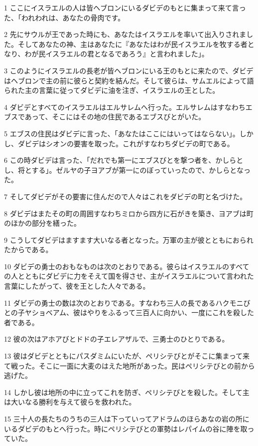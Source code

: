 \par 1 ここにイスラエルの人は皆ヘブロンにいるダビデのもとに集まって来て言った、「われわれは、あなたの骨肉です。
\par 2 先にサウルが王であった時にも、あなたはイスラエルを率いて出入りされました。そしてあなたの神、主はあなたに『あなたはわが民イスラエルを牧する者となり、わが民イスラエルの君となるであろう』と言われました」。
\par 3 このようにイスラエルの長老が皆ヘブロンにいる王のもとに来たので、ダビデはヘブロンで主の前に彼らと契約を結んだ。そして彼らは、サムエルによって語られた主の言葉に従ってダビデに油を注ぎ、イスラエルの王とした。
\par 4 ダビデとすべてのイスラエルはエルサレムへ行った。エルサレムはすなわちエブスであって、そこにはその地の住民であるエブスびとがいた。
\par 5 エブスの住民はダビデに言った、「あなたはここにはいってはならない」。しかし、ダビデはシオンの要害を取った。これがすなわちダビデの町である。
\par 6 この時ダビデは言った、「だれでも第一にエブスびとを撃つ者を、かしらとし、将とする」。ゼルヤの子ヨアブが第一にのぼっていったので、かしらとなった。
\par 7 そしてダビデがその要害に住んだので人々はこれをダビデの町と名づけた。
\par 8 ダビデはまたその町の周囲すなわちミロから四方に石がきを築き、ヨアブは町のほかの部分を繕った。
\par 9 こうしてダビデはますます大いなる者となった。万軍の主が彼とともにおられたからである。
\par 10 ダビデの勇士のおもなものは次のとおりである。彼らはイスラエルのすべての人とともにダビデに力をそえて国を得させ、主がイスラエルについて言われた言葉にしたがって、彼を王とした人々である。
\par 11 ダビデの勇士の数は次のとおりである。すなわち三人の長であるハクモニびとの子ヤショベアム、彼はやりをふるって三百人に向かい、一度にこれを殺した者である。
\par 12 彼の次はアホアびとドドの子エレアザルで、三勇士のひとりである。
\par 13 彼はダビデとともにパスダミムにいたが、ペリシテびとがそこに集まって来て戦った。そこに一面に大麦のはえた地所があった。民はペリシテびとの前から逃げた。
\par 14 しかし彼は地所の中に立ってこれを防ぎ、ペリシテびとを殺した。そして主は大いなる勝利を与えて彼らを救われた。
\par 15 三十人の長たちのうちの三人は下っていってアドラムのほらあなの岩の所にいるダビデのもとへ行った。時にペリシテびとの軍勢はレパイムの谷に陣を取っていた。
